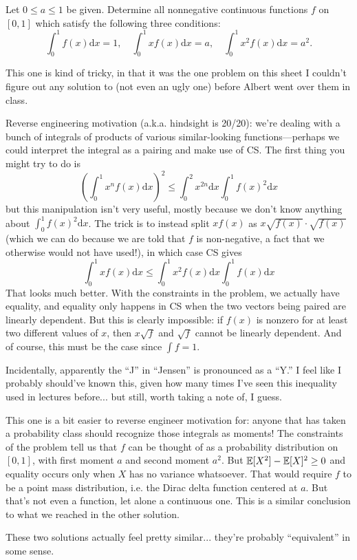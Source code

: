 \begin{problem}
	Let $0\leq a \leq 1$ be given. Determine all nonnegative continuous functions $f$ on $[0,1]$ which satisfy the following three conditions:
	\[
		\int_0^1 f(x) \mathrm{d}x = 1, \quad \int_0^1 xf(x) \mathrm{d}x = a, \quad \int_0^1 x^2 f(x) \mathrm{d}x = a^2.
	\]
\end{problem}
\begin{solution}
	This one is kind of tricky, in that it was the one problem on this sheet I couldn't figure out any solution to (not even an ugly one) before Albert went over them in class.
	
	Reverse engineering motivation (a.k.a. hindsight is 20/20): we're dealing with a bunch of integrals of products of various similar-looking functions---perhaps we could interpret the integral as a pairing and make use of CS. The first thing you might try to do is
	\[
		\left(\int_0^1 x^n f(x) \mathrm{d} x\right)^2 \leq \int_0^2 x^{2n} \mathrm{d} x \int_0^1 f(x)^2 \mathrm{d} x
	\]
	but this manipulation isn't very useful, mostly because we don't know anything about $\int_0^1 f(x)^2 \mathrm{d} x$.
	The trick is to instead split $xf(x)$ as $x\sqrt{f(x)} \cdot \sqrt{f(x)}$ (which we can do because we are told that $f$ is non-negative, a fact that we otherwise would not have used!), in which case CS gives
	\[
		\int_0^1 x f(x) \mathrm{d}x \leq \int_0^1 x^2 f(x)\mathrm{d}x \int_0^1 f(x) \mathrm{d}x
	\]
	That looks much better. With the constraints in the problem, we actually have equality, and equality only happens in CS when the two vectors being paired are linearly dependent. But this is clearly impossible: if $f(x)$ is nonzero for at least two different values of $x$, then $x\sqrt{f}$ and $\sqrt{f}$ cannot be linearly dependent. And of course, this must be the case since $\int f = 1$.
\end{solution}
\begin{solution}[2, Jensen's]
	Incidentally, apparently the ``J'' in ``Jensen'' is pronounced as a ``Y.'' I feel like I probably should've known this, given how many times I've seen this inequality used in lectures before... but still, worth taking a note of, I guess.
	
	This one is a bit easier to reverse engineer motivation for: anyone that has taken a probability class should recognize those integrals as moments! The constraints of the problem tell us that $f$ can be thought of as a probability distribution on $[0,1]$, with first moment $a$ and second moment $a^2$. But $\mathbb{E}[X^2] - \mathbb{E}[X]^2 \geq 0$ and equality occurs only when $X$ has no variance whatsoever. That would require $f$ to be a point mass distribution, i.e. the Dirac delta function centered at $a$. But that's not even a function, let alone a continuous one. This is a similar conclusion to what we reached in the other solution.
	
	These two solutions actually feel pretty similar... they're probably ``equivalent'' in some sense.
\end{solution}
